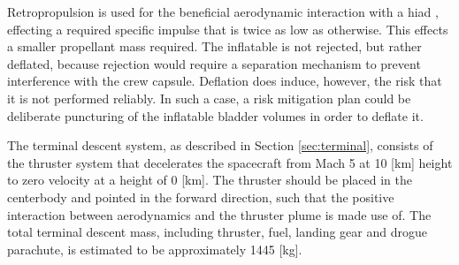 Retropropulsion is used for the beneficial aerodynamic interaction with a \gls{hiad} \cite{Korzun2009}, effecting a required specific impulse that is twice as low as otherwise. This effects a smaller propellant mass required. The inflatable is not rejected, but rather deflated, because rejection would require a separation mechanism to prevent interference with the crew capsule. Deflation does induce, however, the risk that it is not performed reliably. In such a case, a risk mitigation plan could be deliberate puncturing of the inflatable bladder volumes in order to deflate it.


The terminal descent system, as described in Section \ref{sec:terminal}, consists of the thruster system that decelerates the spacecraft from Mach 5 at 10 [km] height to zero velocity at a height of 0 [km]. The thruster should be placed in the centerbody and pointed in the forward direction, such that the positive interaction between aerodynamics and the thruster plume is made use of. The total terminal descent mass, including thruster, fuel, landing gear and drogue parachute, is estimated to be approximately 1445 [kg].